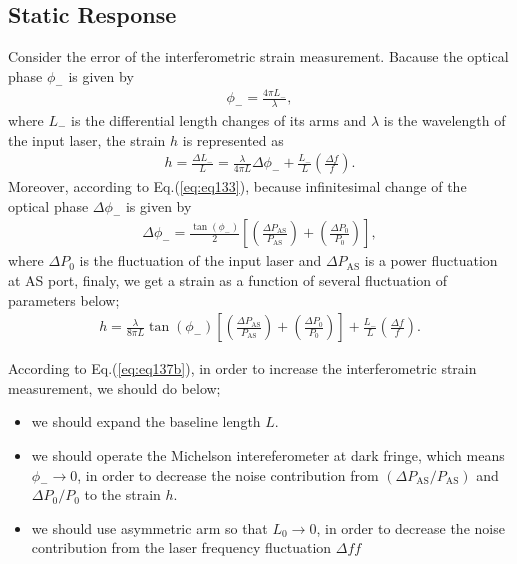 \subsection{Static Response}
Consider the error of the interferometric strain measurement. Bacause the optical phase $\phi_{-}$ is given by
\begin{eqnarray}
  \phi_{-}=\frac{4\pi{L_{-}}}{\lambda},
\end{eqnarray}
where $L_{-}$ is the differential length changes of its arms and $\lambda$ is the wavelength of the input laser, the strain $h$ is represented as 
\begin{eqnarray}
  h = \frac{\Delta{L_{-}}}{L} = \frac{\lambda}{4\pi{L}}\Delta{\phi_{-}} + \frac{L_{-}}{L}\left(\frac{\Delta{f}}{f}\right). \label{eq:eq133_a}
\end{eqnarray}
Moreover, according to Eq.(\ref{eq:eq133}), because infinitesimal change of the optical phase $\Delta{\phi_{-}}$ is given by 
\begin{eqnarray}
  \Delta{\phi_{-}} = \frac{\tan{(\phi_{-})}}{2} \left[\left(\frac{\Delta P_{\mathrm{AS}}}{P_{\mathrm{AS}}}\right) + \left(\frac{\Delta{P_0}}{P_0}\right) \right],
\end{eqnarray}
where $\Delta{P_0}$ is the fluctuation of the input laser and $\Delta{P_{\mathrm{AS}}}$ is a power fluctuation at AS port, finaly, we get a strain as a function of several fluctuation of parameters below;
\begin{eqnarray}
  h = \frac{\lambda}{8\pi{L}}\tan{(\phi_{-})} \left[\left(\frac{\Delta P_{\mathrm{AS}}}{P_{\mathrm{AS}}}\right) + \left(\frac{\Delta{P_0}}{P_0}\right) \right] + \frac{L_{-}}{L}\left(\frac{\Delta{f}}{f}\right). \label{eq:eq137b}
\end{eqnarray}

According to Eq.(\ref{eq:eq137b}), in order to increase the interferometric strain measurement, we should do below;
\begin{itemize}
  \setlength{\itemsep}{1pt}      %
  \setlength{\parskip}{-1pt}     %
  \setlength{\itemindent}{0pt}   %
  \setlength{\labelsep}{5pt}     %
\item we should expand the baseline length $L$.
\item we should operate the Michelson intereferometer at dark fringe, which means $\phi_{-}\to0$, in order to decrease the noise contribution from $(\Delta P_{\mathrm{AS}}/P_{\mathrm{AS}})$ and $\Delta{P_0}/P_0$ to the strain $h$.
\item we should use asymmetric arm so that $L_{0}\to0$, in order to decrease the noise contribution from the laser frequency fluctuation $\Delta{f}{f}$
\end{itemize}

